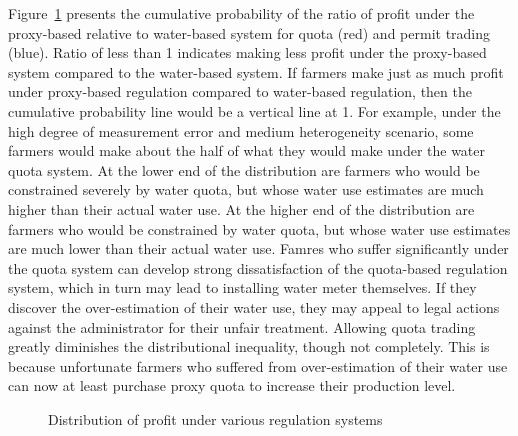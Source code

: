 \documentclass[
  letterpaper,
  DIV=11,
  numbers=noendperiod]{scrartcl}
\begin{document}
Figure~\ref{fig-distributional-equity} presents the cumulative
probability of the ratio of profit under the proxy-based relative to
water-based system for quota (red) and permit trading (blue). Ratio of
less than 1 indicates making less profit under the proxy-based system
compared to the water-based system. If farmers make just as much profit
under proxy-based regulation compared to water-based regulation, then
the cumulative probability line would be a vertical line at 1. For
example, under the high degree of measurement error and medium
heterogeneity scenario, some farmers would make about the half of what
they would make under the water quota system. At the lower end of the
distribution are farmers who would be constrained severely by water
quota, but whose water use estimates are much higher than their actual
water use. At the higher end of the distribution are farmers who would
be constrained by water quota, but whose water use estimates are much
lower than their actual water use. Famres who suffer significantly under
the quota system can develop strong dissatisfaction of the quota-based
regulation system, which in turn may lead to installing water meter
themselves. If they discover the over-estimation of their water use,
they may appeal to legal actions against the administrator for their
unfair treatment. Allowing quota trading greatly diminishes the
distributional inequality, though not completely. This is because
unfortunate farmers who suffered from over-estimation of their water use
can now at least purchase proxy quota to increase their production
level.

\begin{figure}[H]


\caption{\label{fig-distributional-equity}Distribution of profit under
various regulation systems}

\end{figure}%
\end{document}
